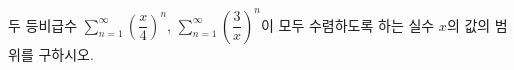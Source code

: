 두 등비급수 $\displaystyle\sum_{n=1}^{\infty}\left(\dfrac{x}{4}\right)^{n}$, $\displaystyle\sum_{n=1}^{\infty}\left(\dfrac{3}{x}\right)^{n}$이 모두 수렴하도록 하는 실수 $x$의 값의 범위를 구하시오.
